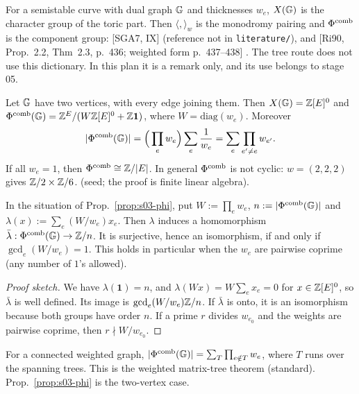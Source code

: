 \begin{remark}\label{rem:s03-grothendieck}
For a semistable curve with dual graph $\mathbb{G}$ and thicknesses $w_e$, $X(\mathbb{G})$ is the character group of the toric part. Then
$\langle,\rangle_w$ is the monodromy pairing and $\Phi^{\mathrm{comb}}$ is the component group: [SGA7, IX] \stcited{} (reference not in
\texttt{literature/}), and [Ri90, Prop.~2.2, Thm~2.3, p.~436; weighted form p.~437--438]
. The tree route
does not use this dictionary. In this plan it is a remark only, and its use belongs to stage 05.
\end{remark}

\begin{proposition}\label{prop:s03-phi}
Let $\mathbb{G}$ have two vertices, with every edge joining them. Then $X(\mathbb{G})=\mathbb{Z}[E]^0$ and $\Phi^{\mathrm{comb}}(\mathbb{G})=\mathbb{Z}^E/(W\mathbb{Z}[E]^0+\mathbb{Z}\mathbf1)$, where
$W=\mathrm{diag}(w_e)$. Moreover
\[|\Phi^{\mathrm{comb}}(\mathbb{G})|=\Big(\prod_ew_e\Big)\sum_e\frac1{w_e}=\sum_e\prod_{e'\ne e}w_{e'}.\]
If all $w_e=1$, then $\Phi^{\mathrm{comb}}\cong\mathbb{Z}/|E|$. In general $\Phi^{\mathrm{comb}}$ is not cyclic: $w=(2,2,2)$ gives $\mathbb{Z}/2\times\mathbb{Z}/6$.
\stproved{} (seed; the proof is finite linear algebra).
\end{proposition}

\begin{lemma}[cyclicity]\label{lem:s03-cyclic}
In the situation of Prop.~\ref{prop:s03-phi}, put $W:=\prod_ew_e$, $n:=|\Phi^{\mathrm{comb}}(\mathbb{G})|$ and $\lambda(x):=\sum_e(W/w_e)x_e$. Then
$\lambda$ induces a homomorphism $\bar\lambda:\Phi^{\mathrm{comb}}(\mathbb{G})\to\mathbb{Z}/n$. It is surjective, hence an isomorphism, if and only if
$\gcd_e(W/w_e)=1$. This holds in particular when the $w_e$ are pairwise coprime (any number of $1$'s allowed). \sttoprove{}
\end{lemma}
\begin{proof}[Proof sketch]
We have $\lambda(\mathbf1)=n$, and $\lambda(Wx)=W\sum_ex_e=0$ for $x\in\mathbb{Z}[E]^0$, so $\bar\lambda$ is well defined. Its image is
$\gcd_e(W/w_e)\mathbb{Z}/n$. If $\bar\lambda$ is onto, it is an isomorphism because both groups have order $n$. If a prime $r$ divides
$w_{e_0}$ and the weights are pairwise coprime, then $r\nmid W/w_{e_0}$.
\end{proof}

\begin{remark}\label{rem:s03-kirchhoff}
For a connected weighted graph, $|\Phi^{\mathrm{comb}}(\mathbb{G})|=\sum_{T}\prod_{e\notin T}w_e$, where $T$ runs over the spanning trees. This is the
weighted matrix-tree theorem \sttoprove{} (standard). Prop.~\ref{prop:s03-phi} is the two-vertex case.
\end{remark}

